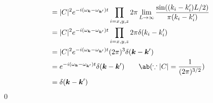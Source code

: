 \documentclass[uplatex,dvipdfmx,a4paper,11pt]{jlreq}
\makeatletter
\newcommand{\kk}{\bm{k}}
\numberwithin{equation}{section}
\theoremstyle{definition}
\renewenvironment{proof}[1][\proofname]{\par
  \normalfont
  \topsep6\p@\@plus6\p@ \trivlist
  \item[\hskip\labelsep{\bfseries #1}\@addpunct{\bfseries}]\ignorespaces\quad\par
}{%
  \qed\endtrivlist\@endpefalse
}
\renewcommand\proofname{証明}
\makeatother
\begin{document}
\begin{proof}
\begin{align}
                                                                         & = |C|^2e^{-i(\omega_{\kk} - \omega_{\kk'})t}\prod_{i=x,y,z}2\pi\lim_{L\to\infty}\frac{\sin((k_i - k_i')L/2)}{\pi(k_i - k_i')}                  \\
                                                                         & = |C|^2e^{-i(\omega_{\kk} - \omega_{\kk'})t}\prod_{i=x,y,z}2\pi\delta(k_i - k_i')                                                              \\
                                                                         & = |C|^2e^{-i(\omega_{\kk} - \omega_{\kk'})t}(2\pi)^3\delta(\kk - \kk')                                                                         \\
                                                                         & = e^{-i(\omega_{\kk} - \omega_{\kk'})t}\delta(\kk - \kk') \qquad \ab(\because |C| = \frac{1}{(2\pi)^{3/2}})                                    \\
                                                                         & = \delta(\kk - \kk')
  \end{align}
\end{proof}
\end{document}
